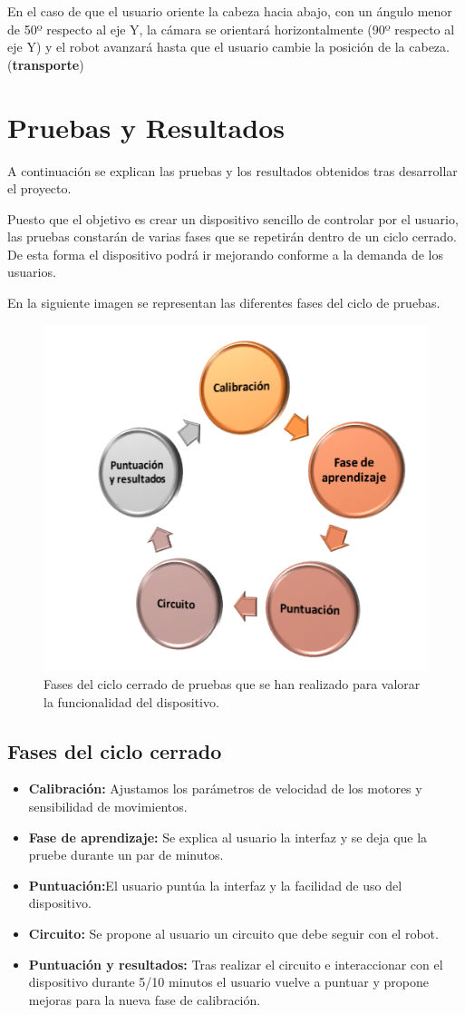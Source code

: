 \documentclass[twoside, 12pt]{epstfg}
\begin{document}
En el caso de que el usuario oriente la cabeza hacia abajo, con un ángulo menor de 50º respecto al eje Y, la cámara se orientará horizontalmente (90º respecto al eje Y) y el robot avanzará hasta que el usuario cambie la posición de la cabeza.(\textbf{transporte})

\chapter{Pruebas y Resultados}

A continuación se explican las pruebas y los resultados obtenidos tras desarrollar el proyecto.

Puesto que el objetivo es crear un dispositivo sencillo de controlar por el usuario, las pruebas constarán de varias fases que se repetirán dentro de un ciclo cerrado. De esta forma el dispositivo podrá ir mejorando conforme a la demanda de los usuarios.

En la siguiente imagen se representan las diferentes fases del ciclo de pruebas.

\begin{figure}[h!]
	\centerline{
		\mbox{\includegraphics[width=.60\textwidth]{images/CicloPruebas.png}}
	}
	\caption{Fases del ciclo cerrado de pruebas que se han realizado para valorar la funcionalidad del dispositivo.}
\end{figure}

\section{Fases del ciclo cerrado}
\begin{itemize}
	\item \textbf{Calibración:} Ajustamos los parámetros de velocidad de los motores y sensibilidad de movimientos.
	\item \textbf{Fase de aprendizaje:} Se explica al usuario la interfaz y se deja que la pruebe durante un par de minutos.
	\item \textbf{Puntuación:}El usuario puntúa la interfaz y la facilidad de uso del dispositivo.
	\item \textbf{Circuito:} Se propone al usuario un circuito que debe seguir con el robot.
	\item \textbf{Puntuación y resultados:} Tras realizar el circuito e interaccionar con el dispositivo durante 5/10 minutos el usuario vuelve a puntuar y propone mejoras para la nueva fase de calibración.
\end{itemize}
\end{document}
